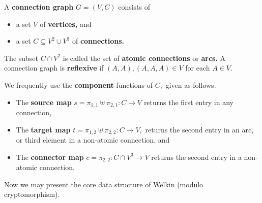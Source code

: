 \begin{definition}
  A \textbf{connection graph} $G = (V, C)$ consists of
  \begin{itemize}
    \item a set $V$ of \textbf{vertices,} and
    \item a set $C \subseteq V^{2} \cup V^{3}$ of \textbf{connections.}
  \end{itemize}
  The subset $C \cap V^{2}$ is called the set of \textbf{atomic connections} or \textbf{arcs.} A connection graph is \textbf{reflexive} if $(A, A), (A, A, A) \in V$ for each $A \in V.$

  We frequently use the \textbf{component} functions of $C,$ given as follows.
  \begin{itemize}
  \item The \textbf{source map} $s = \pi_{1, 1} \uplus \pi_{2, 1}: C \to V$ returns the first entry in any connection,
  \item The \textbf{target map} $t = \pi_{1, 2} \uplus \pi_{2, 2}: C \to V,$ returns the second entry in an arc, or third element in a non-atomic connection, and
  \item The \textbf{connector map} $c = \pi_{2, 2}: C \cap V^{3} \to V$ returns the second entry in a non-atomic connection.
  \end{itemize}
\end{definition}






Now we may present the core data structure of Welkin (modulo cryptomorphism).

